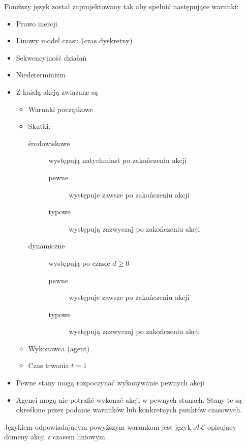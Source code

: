Poniższy język został zaprojektowany tak aby spełnić następujące warunki:
\begin{itemize}
	\item Prawo inercji
	\item Linowy model czasu (czas dyskretny)
	\item Sekwencyjność działań
	\item Niedeterminizm
	\item Z każdą akcją związane są
		\begin{itemize}
			\item Warunki początkowe
			\item Skutki:
				\begin{description}
					\item[środowiskowe] występują natychmiast po zakończeniu akcji
						\begin{description}
							\item[pewne] występuje zawsze po zakończeniu akcji
							\item[typowe] występują zazwyczaj po zakończeniu akcji
						\end{description}
					\item[dynamiczne] występują po czasie $d \geqslant 0$
						\begin{description}
							\item[pewne] występuje zawsze po zakończeniu akcji
							\item[typowe] występują zazwyczaj po zakończeniu akcji
						\end{description}
				\end{description}
			\item Wykonawca (agent)
			\item Czas trwania $t = 1$
		\end{itemize}
	\item Pewne stany mogą rozpoczynać wykonywanie pewnych akcji
	\item Agenci mogą nie potrafić wykonać akcji w pewnych stanach. Stany te są określone przez podanie
	warunków lub konkretnych punktów czasowych.
\end{itemize}
Językiem odpowiadającym powyższym warunkom jest język $\mathcal{AL}$
opisujący domeny akcji z czasem liniowym.

